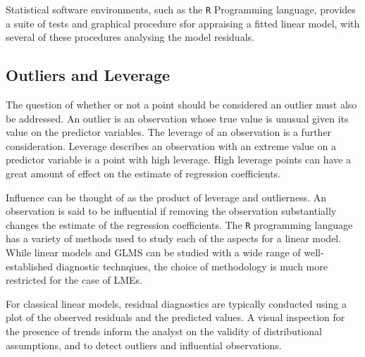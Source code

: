 \documentclass[Main.tex]{subfiles}
\begin{document}
			Statistical software environments, such as the \texttt{R} Programming language, provides a suite of tests and graphical procedure sfor appraising a fitted linear model, with several 
			of these procedures analysing the model residuals.
			
			
			
			
			
			\subsection{Outliers and Leverage}
			
			
			
			The question of whether or not a point should be considered an outlier must also be addressed. An outlier is an observation whose true value is unusual given its value on the predictor variables. The leverage of an observation is a further consideration. Leverage describes an observation with an extreme value on a predictor variable is a point with high leverage. High leverage points can have a great amount of effect on the estimate of regression coefficients.
			
			Influence can be thought of as the product of leverage and outlierness. An observation is said to be influential if removing the observation substantially changes the estimate of the regression coefficients. The \texttt{R} programming language has a variety of methods used to study each of the aspects for a linear model. While linear models and GLMS can be studied with a wide range of well-established diagnostic technqiues, the choice of methodology is much more restricted for the case of LMEs.
			
			For classical linear models, residual diagnostics are typically conducted using a plot of the observed residuals and the predicted values. A visual inspection for the presence of trends inform the analyst on the validity of distributional assumptions, and to detect outliers and influential observations.
			
\end{document}
